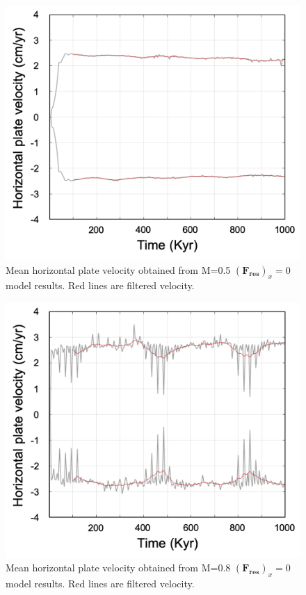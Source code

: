 \documentclass[letterpaper,12pt,notitle]{memphisthesis}                     %
\begin{document}
\begin{figure}[!htb]
	\centering
	\includegraphics[width=0.9\linewidth]{./figs/hmvf005.png}
	\caption{ Mean horizontal plate velocity obtained from M=0.5 $(\boldsymbol{F_{res}})_x=0$ model results. Red lines are filtered velocity.}
	\label{fig:f0m05}
\end{figure}
\begin{figure}[!htb]
	\centering
	\includegraphics[width=0.9\linewidth]{./figs/hmvf008.png}
	\caption{Mean horizontal plate velocity obtained from M=0.8 $(\boldsymbol{F_{res}})_x=0$ model results. Red lines are filtered velocity.}
	\label{fig:f0m08}
\end{figure}
\end{document}
